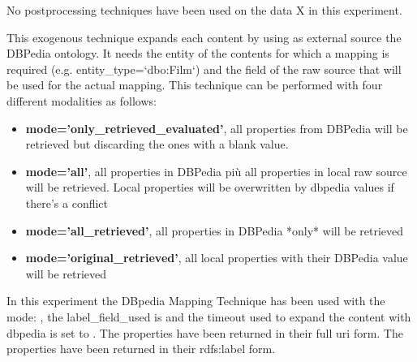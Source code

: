 \documentclass[11pt]{article}
\begin{document}
No postprocessing techniques have been used on the data X in this experiment.




This exogenous technique expands each content by using as external source the DBPedia ontology.
It needs the entity of the contents for which a mapping is required (e.g. entity\_type=`dbo:Film`)
and the field of the raw source that will be used for the actual mapping.
This technique can be performed with four different modalities as follows:

\begin{itemize}
 \item \begin{minipage}
           \textbf{mode='only\_retrieved\_evaluated'}, all properties from DBPedia will be retrieved but discarding the
            ones with a blank value.
        \end{minipage}
 \item \begin{minipage}
           \textbf{mode='all'}, all properties in DBPedia più all properties in local raw source will be retrieved.
            Local properties will be overwritten by dbpedia values if there's a conflict
        \end{minipage}
 \item \begin{minipage}
           \textbf{mode='all\_retrieved'}, all properties in DBPedia *only* will be retrieved
       \end{minipage}
 \item \begin{minipage}
           \textbf{mode='original\_retrieved'}, all local properties with their DBPedia value will be retrieved
       \end{minipage}
\end{itemize}

\hfill\break

In this experiment the DBpedia Mapping Technique has been used with the mode:
, the label_field_used is
 and the timeout used
to expand the content with dbpedia is set to
.
The properties have been returned in their full uri form.
The properties have been returned in their rdfs:label form.
\end{document}
